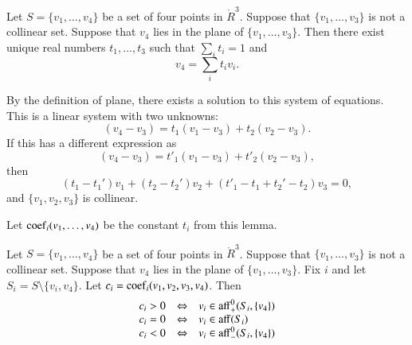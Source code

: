 \begin{tarskidata}
\begin{tarski}

\begin{lemma}
Let $S=\{v_1,\ldots,v_4\}$ be
a set of four points in $\ring{R}^3$.  Suppose
that $\{v_1,\ldots,v_3\}$ is not a collinear
set.   Suppose that $v_4$ lies in the plane of
$\{v_1,\ldots,v_3\}$.  
Then there exist unique real numbers
$t_1,\ldots,t_3$ such that $\sum_i t_i = 1$ and
	$$v_4 = \sum_i t_i v_i.$$
\end{lemma}

\begin{proved}  By the definition of plane,
there 
exists a solution to this system of equations.
This is a linear system with
two unknowns:
	$$(v_4- v_3) = t_1 (v_1-v_3) +
		t_2 (v_2-v_3).
	$$
If this has a different expression as
   $$
   (v_4- v_3) = t'_1 (v_1-v_3) +
		t'_2 (v_2-v_3),
   $$
then 
  $$
  (t_1-t_1') v_1 + (t_2-t_2') v_2 + (t'_1-t_1+t_2'-t_2) v_3 = 0,
  $$
and $\{v_1,v_2,v_3\}$ is collinear.
\swallowed\end{proved}
\end{tarski}



\begin{tarski}

\begin{definition}[coef] 
Let ${\operatorname{coef}}_i(v_1,\ldots,v_4)$
be the constant $t_i$ from this lemma.
\end{definition}
\end{tarski}




\begin{tarski}

\begin{lemma}
Let $S=\{v_1,\ldots,v_4\}$ be
a set of four points in $\ring{R}^3$.  Suppose
that $\{v_1,\ldots,v_3\}$ is not a collinear
set. 
Suppose that $v_4$ lies in the plane of
$\{v_1,\ldots,v_3\}$.  
Fix $i$ and let $S_i = S\setminus \{v_i,v_4\}$.
Let $c_i = {\operatorname{coef}}_i(v_1,v_2,v_3,v_4)$. 
Then 
   $$
   \begin{array}{lll}
     c_i > 0  & \Leftrightarrow & v_i \in {\operatorname{aff}}_+^0(S_i,\{v_4\})\\
     c_i = 0 & \Leftrightarrow & v_i \in {\operatorname{aff}}(S_i)\\
     c_i < 0 & \Leftrightarrow & v_i \in {\operatorname{aff}}_-^0(S_i,\{v_4\})\\
     \end{array}
   $$
\end{lemma}


\end{tarski}
\end{tarskidata}
